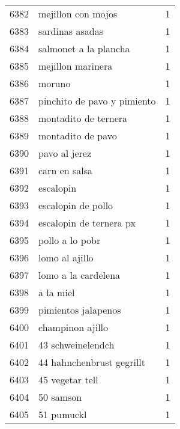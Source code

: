 \begin{tabular}{llr}
6382 &                                 mejillon con mojos &      1 \\
6383 &                                    sardinas asadas &      1 \\
6384 &                              salmonet a la plancha &      1 \\
6385 &                                  mejillon marinera &      1 \\
6386 &                                             moruno &      1 \\
6387 &                        pinchito de pavo y pimiento &      1 \\
6388 &                               montadito de ternera &      1 \\
6389 &                                  montadito de pavo &      1 \\
6390 &                                      pavo al jerez &      1 \\
6391 &                                      carn en salsa &      1 \\
6392 &                                          escalopin &      1 \\
6393 &                                 escalopin de pollo &      1 \\
6394 &                            escalopin de ternera px &      1 \\
6395 &                                    pollo a lo pobr &      1 \\
6396 &                                     lomo al ajillo &      1 \\
6397 &                                lomo a la cardelena &      1 \\
6398 &                                          a la miel &      1 \\
6399 &                                pimientos jalapenos &      1 \\
6400 &                                   champinon ajillo &      1 \\
6401 &                                  43 schweinelendch &      1 \\
6402 &                          44 hahnchenbrust gegrillt &      1 \\
6403 &                                    45 vegetar tell &      1 \\
6404 &                                          50 samson &      1 \\
6405 &                                         51 pumuckl &      1 \\

\end{tabular}
